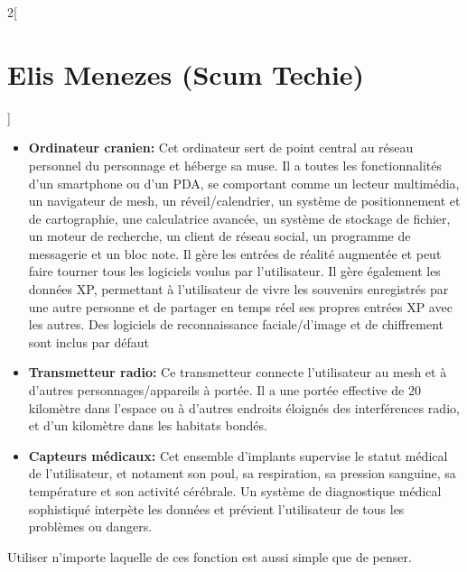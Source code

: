 \documentclass[a4paper,9pt]{article}
\begin{document}
\begin{multicols}{2}[\section*{Elis Menezes (Scum Techie)}]
   \begin{itemize}
      \item \textbf{Ordinateur cranien:} Cet ordinateur sert de point central au
         réseau personnel du personnage et héberge sa muse. Il a toutes
         les fonctionnalités d'un smartphone ou d'un PDA, se comportant comme un
         lecteur multimédia, un navigateur de mesh, un réveil/calendrier, un
         système de positionnement et de cartographie, une calculatrice avancée,
         un système de stockage de fichier, un moteur de recherche, un client de
         réseau social, un programme de messagerie et un bloc note. Il gère les
         entrées de réalité augmentée et peut faire tourner tous les logiciels
         voulus par l'utilisateur. Il gère également les données XP, permettant à
         l'utilisateur de vivre les souvenirs enregistrés par une autre personne et
         de partager en temps réel ses propres entrées XP avec les autres. Des
         logiciels de reconnaissance faciale/d'image et de chiffrement
         sont inclus par défaut
      \item \textbf{Transmetteur radio:} Ce transmetteur connecte l'utilisateur au
         mesh et à d'autres personnages/appareils à portée. Il a une portée
         effective de 20 kilomètre dans l'espace ou à d'autres endroits éloignés
         des interférences radio, et d'un kilomètre dans les habitats bondés.
      \item \textbf{Capteurs médicaux:} Cet ensemble d'implants supervise le
         statut médical de l'utilisateur, et notament son poul, sa respiration, sa
         pression sanguine, sa température et son activité cérébrale. Un système de
         diagnostique médical sophistiqué interpète les données et prévient
         l'utilisateur de tous les problèmes ou dangers.
   \end{itemize} 

   Utiliser n'importe laquelle de ces fonction est aussi simple que de penser.


\end{multicols}
\end{document}
